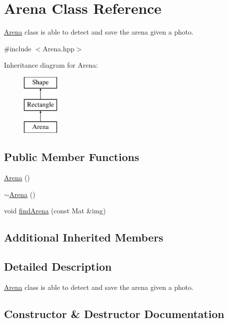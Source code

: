 \hypertarget{class_arena}{}\section{Arena Class Reference}
\label{class_arena}


\mbox{\hyperlink{class_arena}{Arena}} class is able to detect and save the arena given a photo.  




{\ttfamily \#include $<$Arena.\+hpp$>$}

Inheritance diagram for Arena\+:\begin{figure}[H]
\begin{center}
\leavevmode
\includegraphics[height=3.000000cm]{class_arena}
\end{center}
\end{figure}
\subsection*{Public Member Functions}
\begin{DoxyCompactItemize}
\item 
\mbox{\hyperlink{class_arena_a74f105bc709d4728fb07f1984abfd345}{Arena}} ()
\item 
\mbox{\hyperlink{class_arena_ae21b399e9e3f6b8ac4ecc44d7d1667fc}{$\sim$\+Arena}} ()
\item 
void \mbox{\hyperlink{class_arena_aa37acdf43108ab0da04b77bbf79c2f7d}{find\+Arena}} (const Mat \&img)
\end{DoxyCompactItemize}
\subsection*{Additional Inherited Members}


\subsection{Detailed Description}
\mbox{\hyperlink{class_arena}{Arena}} class is able to detect and save the arena given a photo. 

\subsection{Constructor \& Destructor Documentation}
\mbox{\label{class_arena_a74f105bc709d4728fb07f1984abfd345}} 
